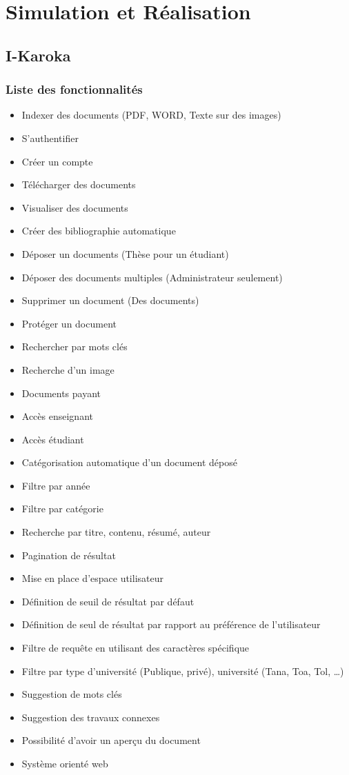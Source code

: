 \chapter{Simulation et Réalisation}
\section{I-Karoka}
\subsection{Liste des fonctionnalités}
\begin{itemize}
    \item Indexer des documents (PDF, WORD, Texte sur des images)
    \item S'authentifier
    \item Créer un compte
    \item Télécharger des documents
    \item Visualiser des documents
    \item Créer des bibliographie automatique
    \item Déposer un documents (Thèse pour un étudiant)
    \item Déposer des documents multiples (Administrateur seulement)
    \item Supprimer un document  (Des documents)
    \item Protéger un document
    \item Rechercher par mots clés
    \item Recherche d'un image
    \item Documents payant
    \item Accès enseignant
    \item Accès étudiant
    \item Catégorisation automatique d'un document déposé
    \item Filtre par année
    \item Filtre par catégorie
    \item Recherche par titre, contenu, résumé, auteur
    \item Pagination de résultat
    \item Mise en place d'espace utilisateur
    \item Définition de seuil de résultat par défaut
    \item Définition de seul de résultat par rapport au préférence de l'utilisateur
    \item Filtre de requête en utilisant des caractères spécifique
    \item Filtre par type d'université (Publique, privé), université (Tana, Toa, Tol, \dots)
    \item Suggestion de mots clés
    \item Suggestion des travaux connexes
    \item Possibilité d'avoir un aperçu du document
    \item Système orienté web
\end{itemize}

